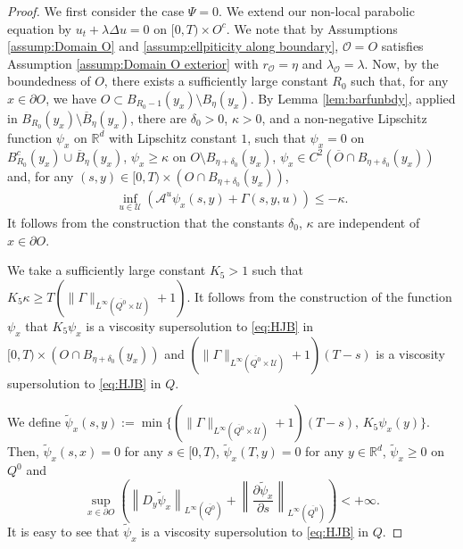 \documentclass[amscd,amssymb,11pt]{article}
\numberwithin{theorem}{section}
\numberwithin{equation}{section}
\begin{document}
\begin{proof}
We first consider the case $\Psi=0$. We extend our non-local parabolic equation by $u_t+\lambda\Delta u=0$ on $[0,T)\times O^c$. We note that
by Assumptions \ref{assump:Domain O} and \ref{assump:ellpiticity along boundary}, $\mathscr{O}=O$ satisfies Assumption
\ref{assump:Domain O exterior} with $r_{\mathscr{O}}=\eta$ and $\lambda_{\mathscr{O}}=\lambda$. Now, by the boundedness of $O$, there exists a sufficiently large constant $R_0$ such that, for any $x\in\partial O$, we have $O\subset B_{R_{0}-1}( y_{x})\setminus B_{\eta}(y_{x})$. By Lemma \ref{lem:barfunbdy}, applied in $B_{R_{0}}(y_{x})\setminus\overline{B}_{\eta}(y_{x})$, there are
$\delta_0>0$, $\kappa>0$, and a non-negative Lipschitz function $\psi_{x}$ on $\mathbb{R}^{d}$ with Lipschitz constant $1$, such that
$\psi_{x}=0$ on $B_{R_{0}}^{c}(y_{x})\cup\overline{B}_{\eta}(y_{x})$, $\psi_{x}\geq\kappa$ on $O\setminus B_{\eta+\delta_{0}}(y_{x})$,
$\psi_{x}\in C^{2}(\overline{O}\cap B_{\eta+\delta_{0}}(y_{x}))$ and, for any $(s,y)\in [0,T)\times(O\cap B_{\eta+\delta_{0}}(y_{x}))$,
\begin{eqnarray*}
\inf_{u\in\mathcal{U}}(\mathscr{A}^{u}\psi_x(s,y)+\Gamma(s,y,u))\leq-\kappa.
\end{eqnarray*}
It follows from the construction that the constants $\delta_0$, $\kappa$ are independent of $x\in\partial O$.

We take a sufficiently large constant $K_{5}>1$ such that $K_{5}\kappa\geq T(\|\Gamma\|_{L^{\infty}(\overline{Q^{0}}\times\mathcal{U})}+1)$.
It follows from the construction of the function $\psi_{x}$ that $K_{5}\psi_{x}$ is a viscosity supersolution to \eqref{eq:HJB} in $[0,T)\times(O\cap B_{\eta+\delta_{0}}(y_{x}))$ and $(\|\Gamma\|_{L^{\infty}(\overline{Q^{0}}\times\mathcal{U})}+1)(T-s)$ is a viscosity supersolution to \eqref{eq:HJB} in $Q$.

We define $\widetilde{\psi}_{x}(s,y):=\min\{(\|\Gamma\|_{L^{\infty}(\overline{Q^{0}}\times\mathcal{U})}+1)(T-s),\,K_{5}\psi_{x}(y)\}$. Then, $\widetilde{\psi}_{x}(s,x)=0$ for any $s\in[0,T)$, $\widetilde{\psi}_{x}(T,y)=0$ for any $y\in\mathbb{R}^{d}$, $\widetilde{\psi}_{x}\geq 0$ on $Q^{0}$ and
\begin{equation*}
\sup_{x\in\partial O}\left(\left\|D_{y}\widetilde{\psi}_{x}\right\|_{L^{\infty}(\overline{Q^{0}})}+\left\|\frac{\partial\widetilde{\psi}_{x}}{\partial s}\right\|_{L^{\infty}(\overline{Q^{0}})}\right)<+\infty.
\end{equation*}
It is easy to see that $\widetilde{\psi}_{x}$ is a viscosity supersolution to \eqref{eq:HJB} in $Q$.


\end{proof}
\end{document}
